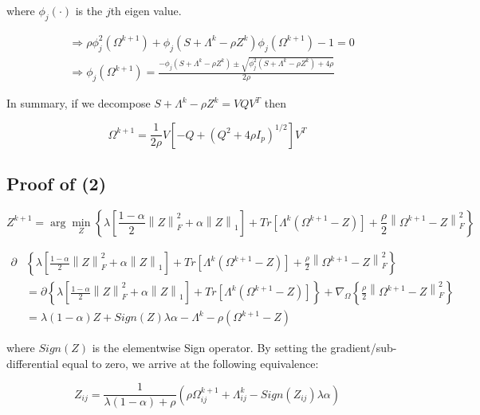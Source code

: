 \documentclass[11pt,]{book}
\theoremstyle{definition}
\theoremstyle{definition}
\theoremstyle{definition}
\theoremstyle{remark}
\begin{document}
where \(\phi_{j}(\cdot)\) is the \(j\)th eigen value.

\begin{align*}
  &\Rightarrow \rho\phi_{j}^{2}(\Omega^{k + 1}) + \phi_{j}\left( S + \Lambda^{k} - \rho Z^{k} \right)\phi_{j}(\Omega^{k + 1}) - 1 = 0 \\
  &\Rightarrow \phi_{j}(\Omega^{k + 1}) = \frac{-\phi_{j}(S + \Lambda^{k} - \rho Z^{k}) \pm \sqrt{\phi_{j}^{2}(S + \Lambda^{k} - \rho Z^{k}) + 4\rho}}{2\rho}
\end{align*}

In summary, if we decompose \(S + \Lambda^{k} - \rho Z^{k} = VQV^{T}\)
then

\[ \Omega^{k + 1} = \frac{1}{2\rho}V\left[ -Q + (Q^{2} + 4\rho I_{p})^{1/2}\right] V^{T} \]

\vspace{1cm}

\hypertarget{proof-of-2}{%
\subsection{Proof of (2)}\label{proof-of-2}}

\[ Z^{k + 1} = \arg\min_{Z}\left\{ \lambda\left[ \frac{1 - \alpha}{2}\left\| Z \right\|_{F}^{2} + \alpha\left\| Z \right\|_{1} \right] + Tr\left[\Lambda^{k}\left(\Omega^{k + 1} - Z\right)\right] + \frac{\rho}{2}\left\| \Omega^{k + 1} - Z \right\|_{F}^{2} \right\} \]

\begin{align*}
  \partial&\left\{ \lambda\left[ \frac{1 - \alpha}{2}\left\| Z \right\|_{F}^{2} + \alpha\left\| Z \right\|_{1} \right] + Tr\left[\Lambda^{k}\left(\Omega^{k + 1} - Z\right)\right] + \frac{\rho}{2}\left\| \Omega^{k + 1} - Z \right\|_{F}^{2} \right\} \\
  &= \partial\left\{ \lambda\left[ \frac{1 - \alpha}{2}\left\| Z \right\|_{F}^{2} + \alpha\left\| Z \right\|_{1} \right] + Tr\left[\Lambda^{k}\left(\Omega^{k + 1} - Z\right)\right]\right\} + \nabla_{\Omega}\left\{\frac{\rho}{2}\left\| \Omega^{k + 1} - Z \right\|_{F}^{2} \right\} \\
  &= \lambda(1 - \alpha)Z + Sign(Z)\lambda\alpha - \Lambda^{k} - \rho\left( \Omega^{k + 1} - Z \right)
\end{align*}

where \(Sign(Z)\) is the elementwise Sign operator. By setting the
gradient/sub-differential equal to zero, we arrive at the following
equivalence:

\[ Z_{ij} = \frac{1}{\lambda(1 - \alpha) + \rho}\left( \rho \Omega_{ij}^{k + 1} + \Lambda_{ij}^{k} - Sign(Z_{ij})\lambda\alpha \right) \]
\end{document}
